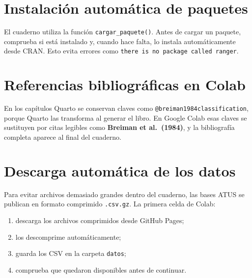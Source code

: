\documentclass[
  spanish,
  10.5pt,
  letterpaper,
  openany,
  headings=big]{scrbook}
\providecommand{\tightlist}{%
  \setlength{\itemsep}{0pt}\setlength{\parskip}{0pt}}
\begin{document}
\section*{Instalación automática de
paquetes}\label{instalaciuxf3n-automuxe1tica-de-paquetes}


El cuaderno utiliza la función \texttt{cargar\_paquete()}. Antes de
cargar un paquete, comprueba si está instalado y, cuando hace falta, lo
instala automáticamente desde CRAN. Esto evita errores como
\texttt{there\ is\ no\ package\ called\ \textquotesingle{}ranger\textquotesingle{}}.

\section*{Referencias bibliográficas en
Colab}\label{referencias-bibliogruxe1ficas-en-colab}


En los capítulos Quarto se conservan claves como
\texttt{@breiman1984classification}, porque Quarto las transforma al
generar el libro. En Google Colab esas claves se sustituyen por citas
legibles como \textbf{Breiman et al.~(1984)}, y la bibliografía completa
aparece al final del cuaderno.

\section*{Descarga automática de los
datos}\label{descarga-automuxe1tica-de-los-datos}


Para evitar archivos demasiado grandes dentro del cuaderno, las bases
ATUS se publican en formato comprimido \texttt{.csv.gz}. La primera
celda de Colab:

\begin{enumerate}
\def\labelenumi{\arabic{enumi}.}
\tightlist
\item
  descarga los archivos comprimidos desde GitHub Pages;
\item
  los descomprime automáticamente;
\item
  guarda los CSV en la carpeta \texttt{datos};
\item
  comprueba que quedaron disponibles antes de continuar.
\end{enumerate}
\end{document}
